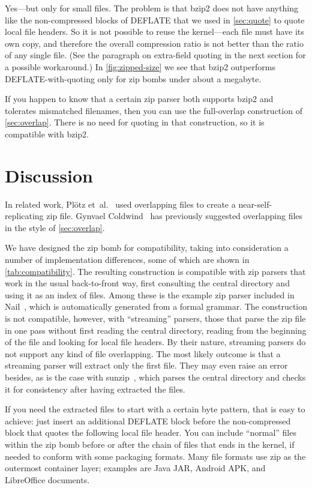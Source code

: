 \documentclass[letterpaper,twocolumn,10pt]{article}
\begin{document}
Yes---but only for small files.
The problem is that bzip2 does not have anything like the
non-compressed blocks of DEFLATE
that we used in \autoref{sec:quote} to quote local file headers.
So it is not possible to reuse the kernel---each file must have
its own copy, and therefore the overall compression ratio
is not better than the ratio of any single file.
(See the paragraph on extra-field quoting
in the next section for a possible workaround.)
In \autoref{fig:zipped-size} we see that
bzip2 outperforms DEFLATE-with-quoting
only for zip bombs under about a megabyte.

If you happen to know that a certain zip parser both supports bzip2
and tolerates mismatched filenames,
then you can use the full-overlap construction of \autoref{sec:overlap}.
There is no need for quoting in that construction,
so it is compatible with bzip2.


\section{Discussion}
\label{sec:discussion}

In related work,
Plötz et~al.~\cite[\S 4]{SAR-PR-2006-04}
used overlapping files to create a
near-self-replicating zip file.
Gynvael Coldwind~\cite[p47]{gynvael}
has previously suggested
overlapping files in the style of \autoref{sec:overlap}.

We have designed the zip bomb for compatibility,
taking into consideration a number of implementation differences,
some of which are shown in \autoref{tab:compatibility}.
The resulting construction is compatible with zip parsers that work
in the usual back-to-front way,
first consulting the central directory
and using it as an index of files.
Among these is the example
zip parser included in Nail~\cite{186219},
which is automatically generated from a formal grammar.
The construction is not compatible, however,
with ``streaming'' parsers,
those that parse the zip file in one pass
without first reading the central directory,
reading from the beginning of the file and looking for local file headers.
By their nature, streaming parsers
do not support any kind of file overlapping.
The most likely outcome is that a streaming parser
will extract only the first file.
They may even raise an error besides,
as is the case with \mbox{sunzip}~\cite{sunzip},
which parses the central directory and checks it for consistency
after having extracted the files.

If you need the extracted files to start with a certain byte pattern,
that is easy to achieve:
just insert an additional DEFLATE block before the non-compressed block
that quotes the following local file header.
You can include ``normal'' files within the zip bomb
before or after the chain of files that ends in the kernel,
if needed to conform with some packaging formats.
Many file formats use zip as the outermost container layer;
examples are Java JAR, Android APK, and LibreOffice documents.
\end{document}
